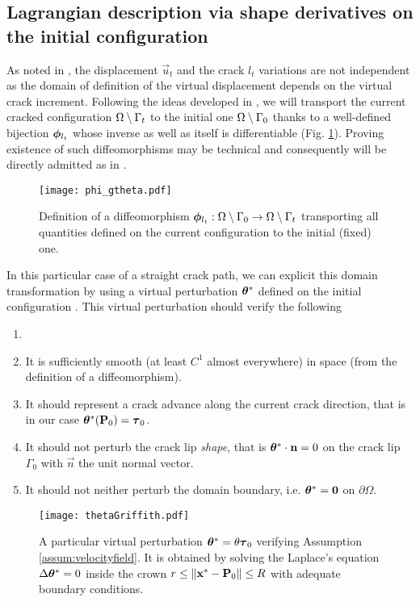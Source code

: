 \subsection{Lagrangian description via shape derivatives on the initial configuration} \label{sec:initialconfiguration}
As noted in \cite{Oleaga:2001}, the displacement $\vec{u}_t$ and the crack $l_t$ variations are not independent as the domain of definition of the virtual displacement depends on the virtual crack increment. Following the ideas developed in \cite{Oleaga:2001,Destuynder:1981,Debruyne:1992}, we will transport the current cracked configuration ${\Omega\setminus\Gamma_t}$ to the initial one ${\Omega\setminus\Gamma_0}$ thanks to a well-defined bijection $\philt_{l_t}$ whose inverse as well as itself is differentiable (Fig. \ref{fig:philt}). Proving existence of such diffeomorphisms may be technical \cite{KhludnevSokolowskiSzulc:2010} and consequently will be directly admitted as in \cite{Debruyne:1992}.
\begin{figure}[htbp]
\centering
\texttt{[image: phi\_gtheta.pdf]}
\caption{Definition of a diffeomorphism $\philt_{l_t}:\domaini\to\domaint$ transporting all quantities defined on the current configuration to the initial (fixed) one.} \label{fig:philt}
\end{figure}

In this particular case of a straight crack path, we can explicit this domain transformation by using a virtual perturbation $\vtheta^*$ defined on the initial configuration \cite{Destuynder:1981,KhludnevSokolowskiSzulc:2010}. This virtual perturbation should verify the following
\begin{assumption} \label{assum:velocityfield}
\begin{enumerate}
\item[]
\item It is sufficiently smooth (at least $C^1$ almost everywhere) in space (from the definition of a diffeomorphism).
\item It should represent a crack advance along the current crack direction, that is in our case $\vtheta^*(\vec{P}_0)=\vtau_0$.
\item It should not perturb the crack lip \emph{shape}, that is $\vtheta^*\cdot\vec{n}=0$ on the crack lip $\Gamma_0$ with $\vec{n}$ the unit normal vector.
\item It should not neither perturb the domain boundary, i.e. $\vtheta^*=\vec{0}$ on $\partial\Omega$.
\end{enumerate}
\end{assumption}
\begin{figure}[htbp]
\centering
\texttt{[image: thetaGriffith.pdf]}
\caption{A particular virtual perturbation $\vtheta^*=\theta\vtau_0$ verifying Assumption \ref{assum:velocityfield}. It is obtained by solving the Laplace's equation $\Delta\vtheta^*=0$ inside the crown $r\leq\norm{\vec{x}^*-\vec{P}_0}\leq R$ with adequate boundary conditions.}
\end{figure}

